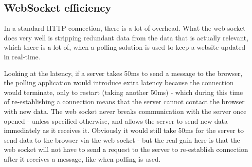 \subsection{WebSocket efficiency}


In a standard HTTP connection, there is a lot of overhead\cite{lubbersgreco}. What the web socket does very well is stripping redundant data from the data that is actually relevant, which there is a lot of, when a polling solution is used to keep a website updated in real-time\cite{lubbersgreco}. 

Looking at the latency, if a server takes 50ms to send a message to the browser, the polling application would introduce extra latency because the connection would terminate, only to restart (taking another 50ms) - which during this time of re-establishing a connection means that the server cannot contact the browser with new data\cite{lubbersgreco}. The web socket never breaks communication with the server once opened - unless specified otherwise, and allows the server to send new data immediately as it receives it\cite{lubbersgreco}. Obviously it would still take 50ms for the server to send data to the browser via the web socket - but the real gain here is that the web socket will not have to send a request to the server to re-establish connection after it receives a message, like when polling is used\cite{lubbersgreco}.